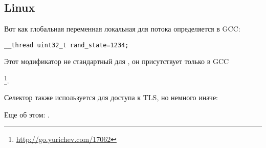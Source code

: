 \subsection{Linux}

Вот как глобальная переменная локальная для потока определяется в GCC:

\begin{lstlisting}
__thread uint32_t rand_state=1234;
\end{lstlisting}

Этот модификатор не стандартный для \CCpp, он присутствует только в GCC

\footnote{\url{http://go.yurichev.com/17062}}.

Селектор  также используется для доступа к \ac{TLS}, но немного иначе:




Еще об этом: \DrepperTLS.

